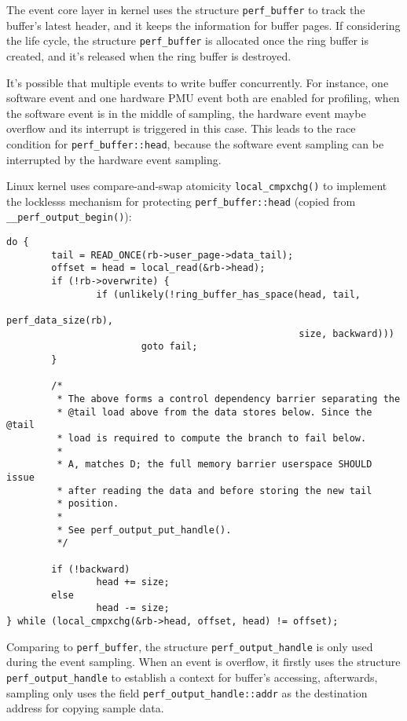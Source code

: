 \documentclass[11pt]{diazessay} %
\def\code#1{\texttt{#1}}
\begin{document}
The event core layer in kernel uses the structure \code{perf\_buffer} to track the buffer's latest header, and it keeps the information for buffer pages.  If considering the life cycle, the structure \code{perf\_buffer} is allocated once the ring buffer is created, and it's released when the ring buffer is destroyed.

It's possible that multiple events to write buffer concurrently.  For instance, one software event and one hardware PMU event both are enabled for profiling, when the software event is in the middle of sampling, the hardware event maybe overflow and its interrupt is triggered in this case.  This leads to the race condition for \code{perf\_buffer::head}, because the software event sampling can be interrupted by the hardware event sampling.

Linux kernel uses compare-and-swap atomicity \code{local\_cmpxchg()} to implement the locklesss mechanism for protecting \code{perf\_buffer::head} (copied from \code{\_\_perf\_output\_begin()}):

\begin{lstlisting}
do {
        tail = READ_ONCE(rb->user_page->data_tail);
        offset = head = local_read(&rb->head);
        if (!rb->overwrite) {
                if (unlikely(!ring_buffer_has_space(head, tail,
                                                    perf_data_size(rb),
                                                    size, backward)))
                        goto fail;
        }

        /*
         * The above forms a control dependency barrier separating the
         * @tail load above from the data stores below. Since the @tail
         * load is required to compute the branch to fail below.
         *
         * A, matches D; the full memory barrier userspace SHOULD issue
         * after reading the data and before storing the new tail
         * position.
         *
         * See perf_output_put_handle().
         */

        if (!backward)
                head += size;
        else
                head -= size;
} while (local_cmpxchg(&rb->head, offset, head) != offset);
\end{lstlisting}

Comparing to \code{perf\_buffer}, the structure \code{perf\_output\_handle} is only used during the event sampling.  When an event is overflow, it firstly uses the structure \code{perf\_output\_handle} to establish a context for buffer's accessing, afterwards, sampling only uses the field \code{perf\_output\_handle::addr} as the destination address for copying sample data. 
\end{document}
